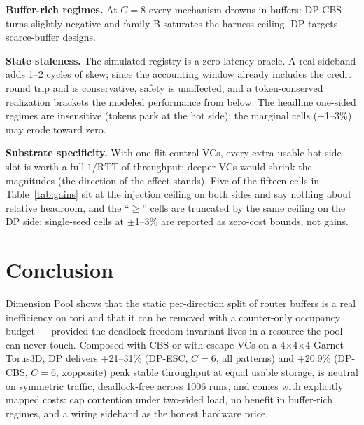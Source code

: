 \documentclass[10pt]{article}
\begin{document}
\textbf{Buffer-rich regimes.} At $C{=}8$ every mechanism drowns in
buffers: DP-CBS turns slightly negative and family B saturates the
harness ceiling. DP targets scarce-buffer designs.

\textbf{State staleness.} The simulated registry is a zero-latency
oracle. A real sideband adds 1--2 cycles of skew; since the accounting
window already includes the credit round trip and is conservative, safety
is unaffected, and a token-conserved realization brackets the modeled
performance from below. The headline one-sided regimes are insensitive
(tokens park at the hot side); the marginal cells (+1--3\%) may erode
toward zero.

\textbf{Substrate specificity.} With one-flit control VCs, every extra
usable hot-side slot is worth a full $1/\text{RTT}$ of throughput; deeper
VCs would shrink the magnitudes (the direction of the effect stands).
Five of the fifteen cells in Table~\ref{tab:gains} sit at the injection
ceiling on both sides and say nothing about relative headroom, and the
``$\ge$'' cells are truncated by the same ceiling on the DP side;
single-seed cells at $\pm$1--3\% are reported as zero-cost bounds, not
gains.

\section{Conclusion}

Dimension Pool shows that the static per-direction split of router
buffers is a real inefficiency on tori and that it can be removed with a
counter-only occupancy budget --- provided the deadlock-freedom invariant
lives in a resource the pool can never touch. Composed with CBS or with
escape VCs on a 4$\times$4$\times$4 Garnet Torus3D, DP delivers
+21--31\% (DP-ESC, $C{=}6$, all patterns) and +20.9\% (DP-CBS, $C{=}6$,
xopposite) peak stable throughput at equal usable storage, is neutral on
symmetric traffic, deadlock-free across 1006 runs, and comes with
explicitly mapped costs: cap contention under two-sided load, no benefit
in buffer-rich regimes, and a wiring sideband as the honest hardware
price.
\end{document}
